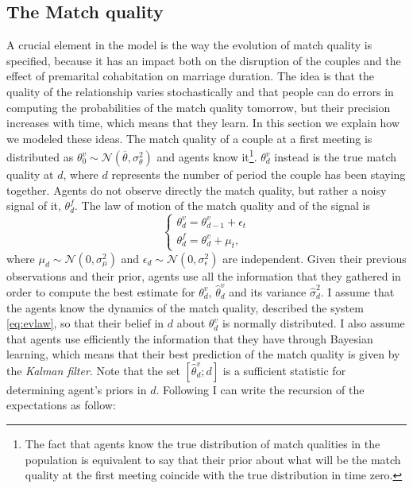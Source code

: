 \documentclass[12pt]{article}
\begin{document}
\subsection{The Match quality}
A crucial element in the model is the way the evolution of match quality is specified, because it has an impact both on the disruption of the couples and the effect of premarital cohabitation on marriage duration. The idea is that the quality of the relationship varies stochastically and that people can do errors in computing the probabilities of the match quality tomorrow, but their precision increases with time, which means that they learn. In this section we explain how we modeled these ideas. 
 The match quality of a couple at a first meeting is distributed as $\theta^v_0\sim\mathcal{N}(\overline{\theta},\sigma_\theta^2)$ and agents know it\footnote{The fact that agents know the true distribution of match qualities in the population is equivalent to say that their prior about what will be the match quality at the first meeting coincide with the true distribution in time zero.}. $\theta^v_d$ instead is the true match quality at $d$, where $d$ represents the number of period the couple has been staying together. Agents do not observe directly the match quality, but rather a noisy signal of it,  $\theta^f_d$. The law of motion of the match quality and of the signal is
\begin{equation}\label{eq:evlaw}
\begin{cases}
\theta^v_d=\theta^v_{d-1}+\epsilon_t\\
\theta^f_d=\theta^v_{d}+\mu_t,
\end{cases}
\end{equation}
where $\mu_d\sim\mathcal{N}(0,\sigma_\mu^2)$ and  $\epsilon_d\sim\mathcal{N}(0,\sigma_\epsilon^2)$ are independent. Given their previous observations and their prior, agents use all the information that they gathered in order to compute the best estimate for $\theta^v_d$, $\hat{\theta}^v_d$ and its variance $\hat{\sigma}_{d}^2$. I assume that the agents know the dynamics of the match quality, described the system \ref{eq:evlaw}, so that their belief in $d$ about $\theta^v_d$ is normally distributed. I also assume that agents use efficiently the information that they have through Bayesian learning, which means that their best prediction of the match quality is given by the \textit{Kalman filter}. Note  that the set $[\hat{\theta}^v_d;d]$ is a sufficient statistic for determining agent's priors in $d$. Following \citet{sargent2012} I can write the recursion of the expectations as follow:
\end{document}
